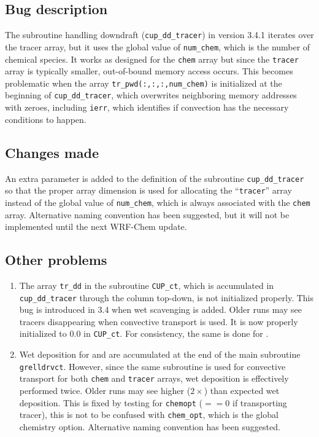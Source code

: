 \subsection{Bug description}\label{a-ssec:bug/ctrans/bug}
	The subroutine handling downdraft (\texttt{cup\_dd\_tracer}) in version 3.4.1 iterates over the tracer array, but it uses the global value of \texttt{num\_chem}, which is the number of chemical species. It works as designed for the \texttt{chem} array but since the \texttt{tracer} array is typically smaller, out-of-bound memory access occurs. This becomes problematic when the array \texttt{tr\_pwd(:,:,:,num\_chem)} is initialized at the beginning of \texttt{cup\_dd\_tracer}, which overwrites neighboring memory addresses with zeroes, including \texttt{ierr}, which identifies if convection has the necessary conditions to happen.

\subsection{Changes made}\label{a-ssec:bug/ctrans/fix}
	An extra parameter is added to the definition of the subroutine \texttt{cup\_dd\_tracer} so that the proper array dimension is used for allocating the ``\texttt{tracer}'' array instead of the global value of \texttt{num\_chem}, which is always associated with the \texttt{chem} array. Alternative naming convention has been suggested, but it will not be implemented until the next WRF-Chem update.

\subsection{Other problems}\label{a-ssec:bug/ctrans/misc}
	\begin{enumerate}
		\item The array \texttt{tr\_dd} in the subroutine \texttt{CUP\_ct}, which is accumulated in \texttt{cup\_dd\_tracer} through the column top-down, is not initialized properly. This bug is introduced in 3.4 when wet scavenging is added. Older runs may see tracers disappearing when convective transport is used. It is now properly initialized to $0.0$ in \texttt{CUP\_ct}. For consistency, the same is done for .
		\item Wet deposition for  and  are accumulated at the end of the main subroutine \texttt{grelldrvct}. However, since the same subroutine is used for convective transport for both \texttt{chem} and \texttt{tracer} arrays, wet deposition is effectively performed twice. Older runs may see higher ($2\times$) than expected wet deposition. This is fixed by testing for \texttt{chemopt} ($==0$ if transporting tracer), this is not to be confused with \texttt{chem\_opt}, which is the global chemistry option. Alternative naming convention has been suggested.
	\end{enumerate}